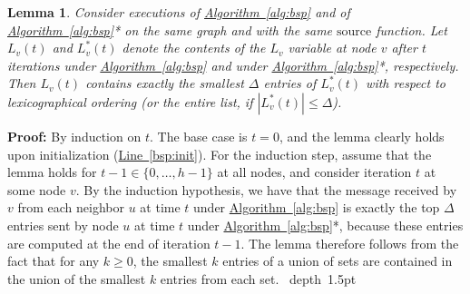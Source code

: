 \documentclass[letterpaper,11pt]{article}
\newcommand{\namedref}[2]{\hyperref[#2]{#1~\ref*{#2}}}
\newcommand{\algref}[1]{\namedref{Algorithm}{#1}}
\newcommand{\lineref}[1]{\namedref{Line}{#1}}
\newtheorem{lemma}[theorem]{Lemma}
\newcommand{\blackslug}{\hbox{\hskip 1pt \vrule width 4pt height 8pt
depth 1.5pt \hskip 1pt}}
\newcommand{\QED}{\quad\blackslug\lower 8.5pt\null\par}
\newenvironment{proof}[1][Proof:]{\noindent \textbf{#1}\xspace}{\QED}
\begin{document}
\begin{lemma}\label{lem:bsp_trunc}
Consider executions of \algref{alg:bsp} and of \algref{alg:bsp}* on the same
graph and with the same $\textrm{source}$ function. Let $L_v(t)$ and
$L_v^*(t)$ denote the contents of the $L_v$ variable at node $v$ after $t$
iterations under \algref{alg:bsp} and under \algref{alg:bsp}*, respectively.
Then $L_v(t)$ contains exactly the smallest $\Delta$ entries of $L_v^*(t)$ with
respect to lexicographical ordering (or the entire list, if $|L_v^*(t)|\leq
\Delta$).
\end{lemma}
\begin{proof}
By induction on $t$. The base case is $t=0$, and the lemma clearly holds upon
initialization (\lineref{bsp:init}). For the induction step, assume that the
lemma holds for $t-1\in \{0,\ldots,h-1\}$ at all nodes, and consider iteration
$t$ at some node $v$. By the induction hypothesis, we have that the message
received by $v$ from each neighbor $u$ at time $t$ under \algref{alg:bsp} is
exactly the top $\Delta$ entries sent by node $u$ at time $t$ under
\algref{alg:bsp}*, because these entries are computed at the end of iteration
$t-1$. The lemma therefore follows from the fact that for any $k\ge0$, the
smallest $k$ entries of a union of sets are contained in the union of the
smallest $k$ entries from each set.
\end{proof}
\end{document}
